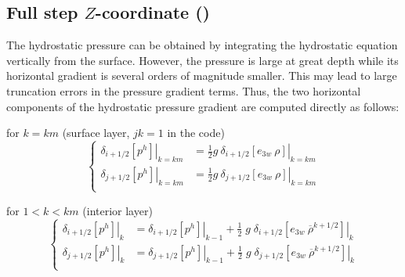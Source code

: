 \documentclass[../tex_main/NEMO_manual]{subfiles}
\begin{document}
\subsection{Full step $Z$-coordinate (\protect{})}
\label{subsec:DYN_hpg_zco}

The hydrostatic pressure can be obtained by integrating the hydrostatic equation vertically from the surface.
However, the pressure is large at great depth while its horizontal gradient is several orders of magnitude smaller.
This may lead to large truncation errors in the pressure gradient terms.
Thus, the two horizontal components of the hydrostatic pressure gradient are computed directly as follows:

for $k=km$ (surface layer, $jk=1$ in the code)
\begin{equation} \label{eq:dynhpg_zco_surf}
\left\{ \begin{aligned}
					\left. \delta _{i+1/2} \left[  p^h 			 \right] \right|_{k=km} 
&= \frac{1}{2} g \ 	\left. \delta _{i+1/2} \left[  e_{3w} \ \rho \right] \right|_{k=km}   \\
     					\left. \delta _{j+1/2} \left[  p^h  			 \right] \right|_{k=km} 
&= \frac{1}{2} g \ 	\left. \delta _{j+1/2} \left[  e_{3w} \ \rho \right] \right|_{k=km}   \\
\end{aligned} \right.
\end{equation} 

for $1<k<km$ (interior layer)
\begin{equation} \label{eq:dynhpg_zco}
\left\{ \begin{aligned}
					\left. \delta _{i+1/2} \left[  p^h 			 \right] \right|_{k} 
&=					\left. \delta _{i+1/2} \left[  p^h 			 \right] \right|_{k-1} 
+    \frac{1}{2}\;g\;	\left. \delta _{i+1/2} \left[  e_{3w} \ \overline {\rho}^{k+1/2} \right] \right|_{k}   \\
     					\left. \delta _{j+1/2} \left[  p^h  			 \right] \right|_{k} 
&=     				\left. \delta _{j+1/2} \left[  p^h  			 \right] \right|_{k-1} 
+    \frac{1}{2}\;g\;	\left. \delta _{j+1/2} \left[  e_{3w} \ \overline {\rho}^{k+1/2} \right] \right|_{k}   \\
\end{aligned} \right.
\end{equation} 
\end{document}
